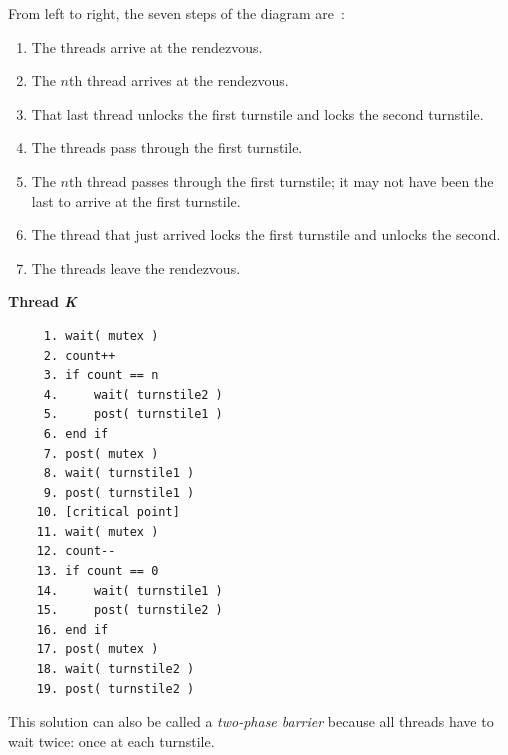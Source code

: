 From left to right, the seven steps of the diagram are~\cite{mte241}:
\begin{enumerate}
	\item The threads arrive at the rendezvous.
	\item The $n$th thread arrives at the rendezvous.
	\item That last thread unlocks the first turnstile and locks the second turnstile.
	\item The threads pass through the first turnstile.
	\item The $n$th thread passes through the first turnstile; it may not have been the last to arrive at the first turnstile.
	\item The thread that just arrived locks the first turnstile and unlocks the second.
	\item The threads leave the rendezvous.
\end{enumerate}

\textbf{Thread \textit{K}}\vspace{-2em}
  \begin{verbatim}
	 1. wait( mutex )
	 2. count++
	 3. if count == n
	 4.     wait( turnstile2 )
	 5.     post( turnstile1 )
	 6. end if
	 7. post( mutex )
	 8. wait( turnstile1 )
	 9. post( turnstile1 )
	10. [critical point]
	11. wait( mutex )
	12. count--
	13. if count == 0
	14.     wait( turnstile1 )
	15.     post( turnstile2 )
	16. end if
	17. post( mutex )
	18. wait( turnstile2 )
	19. post( turnstile2 )
  \end{verbatim}
\vspace{-2em}

This solution can also be called a \textit{two-phase barrier} because all threads have to wait twice: once at each turnstile.





